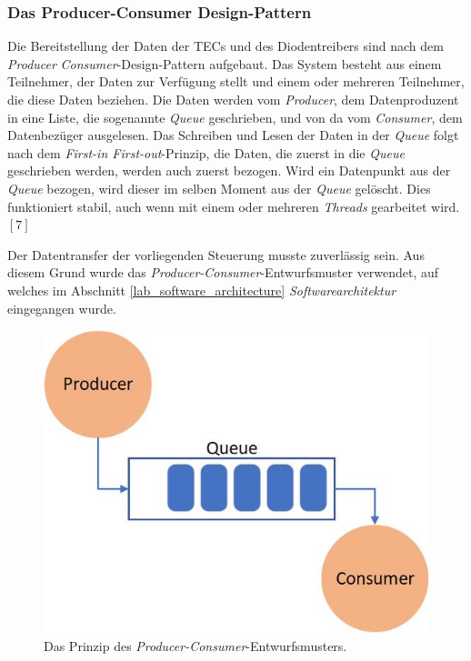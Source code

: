 \subsubsection{Das Producer-Consumer Design-Pattern}
\label{section:_producer_consumer}
Die Bereitstellung der Daten der TECs und des Diodentreibers sind nach dem \textit{Producer} \textit{Consumer}-Design-Pattern aufgebaut. Das System besteht aus einem Teilnehmer, der Daten zur Verfügung stellt und einem oder mehreren Teilnehmer, die diese Daten beziehen. Die Daten werden vom \textit{Producer}, dem Datenproduzent in eine Liste, die sogenannte \textit{Queue} geschrieben, und von da vom \textit{Consumer}, dem Datenbezüger ausgelesen. Das Schreiben und Lesen der Daten in der \textit{Queue} folgt nach dem \textit{First-in First-out}-Prinzip, die Daten, die zuerst in die \textit{Queue} geschrieben werden, werden auch zuerst bezogen. Wird ein Datenpunkt aus der \textit{Queue} bezogen, wird dieser im selben Moment aus der \textit{Queue} gelöscht. Dies funktioniert stabil, auch wenn mit einem oder mehreren \textit{Threads} gearbeitet wird. $[7]$

Der Datentransfer der vorliegenden Steuerung musste zuverlässig sein. Aus diesem Grund wurde das \textit{Producer-Consumer}-Entwurfsmuster verwendet, auf welches im Abschnitt \ref{lab_software_architecture}  \textit{Softwarearchitektur} eingegangen wurde.

\begin{figure}[H]
    \centering
    \includegraphics[scale=0.5]{98_images/producer_consumer_design_pattern.jpg}
    \caption{Das Prinzip des \textit{Producer-Consumer}-Entwurfsmusters.}
    \label{fig:_producer_consumer}
 \end{figure}

